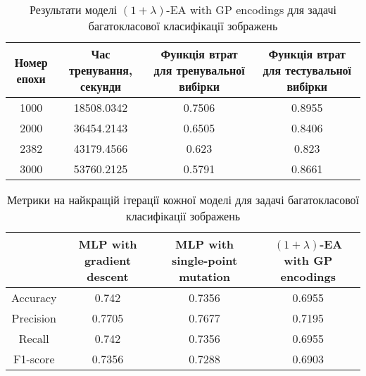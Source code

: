 \begin{table}[ht]
	\centering
	\begin{adjustbox}{max width=\textwidth}
		\begin{tabular}{|c|c|c|c|}
			\hline 
			Номер епохи & Час тренування, секунди & Функція втрат для тренувальної вибірки & Функція втрат для тестувальної вибірки \\
			\hline 
			1000 & 18508.0342 & 0.7506 & 0.8955 \\
			\hline 
			2000 & 36454.2143 & 0.6505 & 0.8406 \\
			\hline
			2382 & 43179.4566 & 0.623 & 0.823 \\
			\hline
			3000 & 53760.2125 & 0.5791 & 0.8661 \\
			\hline
		\end{tabular}
	\end{adjustbox}
	\caption{Результати моделі $(1+\lambda)$-EA with GP encodings для задачі багатокласової класифікації зображень}
	\label{ea_mc_id_results}
\end{table}

\begin{table}[ht]
	\centering
	\begin{adjustbox}{max width=\textwidth}
		\begin{tabular}{|c|c|c|c|}
			\hline 
			& MLP with gradient descent & MLP with single-point mutation & $(1+\lambda)$-EA with GP encodings \\
			\hline 
			Accuracy & 0.742 & 0.7356 & 0.6955 \\
			\hline 
			Precision & 0.7705 & 0.7677 & 0.7195 \\
			\hline
			Recall & 0.742 & 0.7356 & 0.6955 \\
			\hline
			F1-score & 0.7356 & 0.7288 & 0.6903 \\
			\hline
		\end{tabular}
	\end{adjustbox}
	\caption{Метрики на найкращій ітерації кожної моделі для задачі багатокласової класифікації зображень}
	\label{metrics_mc_id_results}
\end{table}


